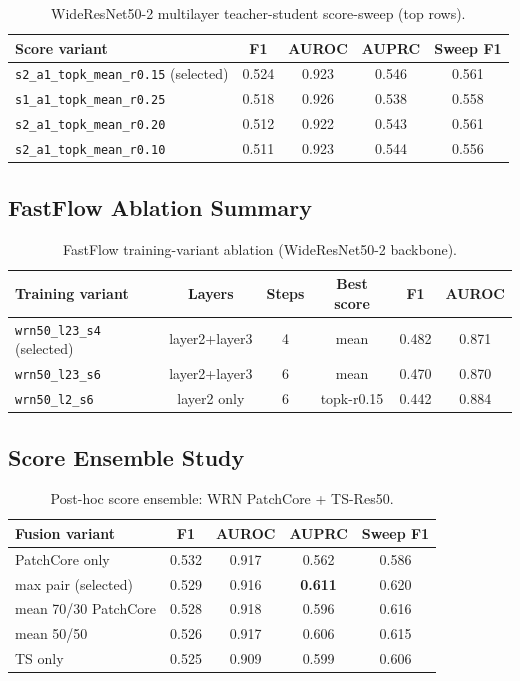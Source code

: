 \documentclass[11pt]{article}
\begin{document}
\begin{table}[H]
\centering
\caption{WideResNet50-2 multilayer teacher-student score-sweep (top rows).}
\label{tab:appendix_ts_wrn}
\begin{tabular}{lcccc}
\toprule
Score variant & F1 & AUROC & AUPRC & Sweep F1 \\
\midrule
\texttt{s2\_a1\_topk\_mean\_r0.15} (selected) & 0.524 & 0.923 & 0.546 & 0.561 \\
\texttt{s1\_a1\_topk\_mean\_r0.25}             & 0.518 & 0.926 & 0.538 & 0.558 \\
\texttt{s2\_a1\_topk\_mean\_r0.20}             & 0.512 & 0.922 & 0.543 & 0.561 \\
\texttt{s2\_a1\_topk\_mean\_r0.10}             & 0.511 & 0.923 & 0.544 & 0.556 \\
\bottomrule
\end{tabular}
\end{table}

\subsection{FastFlow Ablation Summary}

\begin{table}[H]
\centering
\caption{FastFlow training-variant ablation (WideResNet50-2 backbone).}
\label{tab:appendix_fastflow}
\begin{tabular}{lccccc}
\toprule
Training variant & Layers & Steps & Best score & F1 & AUROC \\
\midrule
\texttt{wrn50\_l23\_s4} (selected) & layer2+layer3 & 4 & mean       & 0.482 & 0.871 \\
\texttt{wrn50\_l23\_s6}            & layer2+layer3 & 6 & mean       & 0.470 & 0.870 \\
\texttt{wrn50\_l2\_s6}             & layer2 only   & 6 & topk-r0.15 & 0.442 & 0.884 \\
\bottomrule
\end{tabular}
\end{table}

\subsection{Score Ensemble Study}

\begin{table}[H]
\centering
\caption{Post-hoc score ensemble: WRN PatchCore + TS-Res50.}
\label{tab:appendix_ensemble}
\begin{tabular}{lcccc}
\toprule
Fusion variant & F1 & AUROC & AUPRC & Sweep F1 \\
\midrule
PatchCore only         & 0.532 & 0.917 & 0.562 & 0.586 \\
max pair (selected)    & 0.529 & 0.916 & \textbf{0.611} & 0.620 \\
mean 70/30 PatchCore   & 0.528 & 0.918 & 0.596 & 0.616 \\
mean 50/50             & 0.526 & 0.917 & 0.606 & 0.615 \\
TS only                & 0.525 & 0.909 & 0.599 & 0.606 \\
\bottomrule
\end{tabular}
\end{table}
\end{document}
